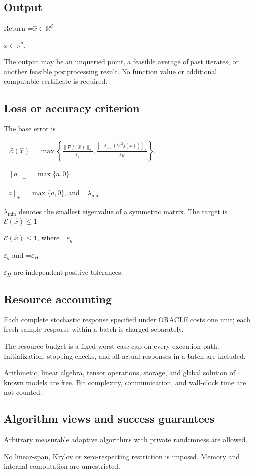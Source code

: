 \documentclass[10pt,a4paper]{article}
\newcommand{\AtlasMath}[1]{\par\begingroup\centering\setbox0=\hbox{$\displaystyle #1$}\ifdim\wd0>1.4\linewidth\typeout{ATLAS WIDE FORMULA: \the\wd0}\fi\ifdim\wd0>\linewidth\resizebox{\linewidth}{!}{\box0}\else\box0\fi\par\endgroup}
\newcommand{\AtlasInlineMath}[1]{\begingroup\setbox0=\hbox{$#1$}\ifdim\wd0>.4\linewidth\endgroup\AtlasMath{#1}\else\endgroup$#1$\fi}
\begin{document}
\subsection{Output}
Return \AtlasInlineMath{\widehat{x}\in \mathbb{R}^d}.

The output may be an unqueried point, a feasible average of past iterates, or another feasible postprocessing result. No function value or additional computable certificate is required.

\subsection{Loss or accuracy criterion}
The base error is


\AtlasMath{\mathcal{E}(\widehat{x})=\max\left\{\frac{\|\nabla f(\widehat{x})\|_2}{\varepsilon_g},\frac{[-\lambda_{\min}(\nabla^2f(\widehat{x}))]_+}{\varepsilon_H}\right\}.}


\AtlasInlineMath{[a]_+=\max\{a,0\}}, and \AtlasInlineMath{\lambda_{\min}} denotes the smallest eigenvalue of a symmetric matrix. The target is \AtlasInlineMath{\mathcal{E}(\widehat{x})\le1}, where \AtlasInlineMath{\varepsilon_g} and \AtlasInlineMath{\varepsilon_H} are independent positive tolerances.

\subsection{Resource accounting}
Each complete stochastic response specified under ORACLE costs one unit; each fresh-sample response within a batch is charged separately.

The resource budget is a fixed worst-case cap on every execution path. Initialization, stopping checks, and all actual responses in a batch are included.

Arithmetic, linear algebra, tensor operations, storage, and global solution of known models are free. Bit complexity, communication, and wall-clock time are not counted.

\subsection{Algorithm views and success guarantees}
Arbitrary measurable adaptive algorithms with private randomness are allowed.

No linear-span, Krylov or zero-respecting restriction is imposed. Memory and internal computation are unrestricted.
\end{document}
